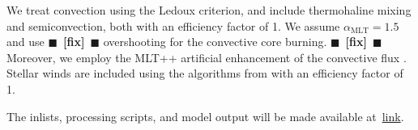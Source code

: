 \documentclass[twocolumn,twocolappendix,trackchanges]{aastex63}
\newcommand{\todo}[1]{{\large $\blacksquare$~\textbf{\color{red}[#1]}}~$\blacksquare$}
\begin{document}
We treat convection using the Ledoux criterion, and include
thermohaline mixing and semiconvection, both with an efficiency factor
of 1. We assume $\alpha_\mathrm{MLT}=1.5$ and use \todo{fix}
\cite{brott:11} overshooting for the convective core
burning. \todo{fix} Moreover, we employ the MLT++ artificial
enhancement of the convective flux \citep[e.g.,][]{paxton:15}. Stellar
winds are included using the algorithms from \cite{vink:01} with an
efficiency factor of
1.%

The inlists, processing scripts, and model output will be made available at~\href{link}{link}.



\end{document}
